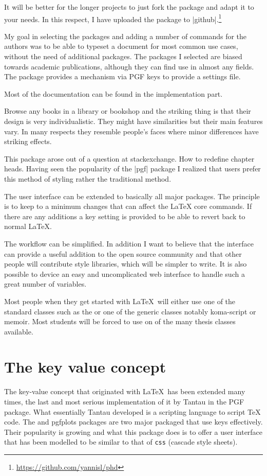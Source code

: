 It will be better for the longer projects to just fork the
 package and adapt it to your needs. In this respect, I have
 uploaded the package to |github|.\footnote{\url{https://github.com/yannisl/phd}}

 My goal in selecting the packages and adding a number of 
 commands for the authors was to be able to typeset a 
 document for most common use cases, without the need of
 additional packages. The packages I selected are biased
 towards academic publications, although they can find use
 in almost any fields. The package provides a mechanism via
 PGF keys to provide a settings file. 
 
 Most of the documentation can be found in the implementation part.

Browse any books in a library or bookshop and the striking thing is that their design is very individualistic. They might have similarities but their main features vary. In many respects they resemble people's faces where minor differences have striking effects.

This package arose out of a question at stackexchange. How to redefine chapter heads. Having seen the popularity of the |pgf| package \cite{pkg-pgf} I realized that \latex users prefer this method of styling rather the traditional \latex method.

The user interface can be extended to basically all major packages. The principle is to keep to a minimum changes that can affect the LaTeX core commands. If there are any additions a key setting is provided to be able to revert back to normal LaTeX.

The workflow can be simplified. In addition I want to believe that the interface can provide a useful addition to the open source community and that other people will contribute style libraries, which will be simpler to write. It is also possible
to device an easy and uncomplicated web interface to handle
such a great number of variables.


Most people when they get started with \LaTeX\ will either use one of the standard classes such as the  or one of the generic classes notably koma-script or memoir. Most students will be forced to use on of the many thesis classes available.

\section{The key value concept}

The key-value concept that originated with \LaTeX\ has been extended many times, the last and most serious implementation of it by Tantau in the PGF package. What essentially Tantau developed is a scripting language to script TeX code. The \tikzname and pgfplots packages are two major packaged that use keys effectively. Their popularity is growing and what this package does is to offer a user interface that has been modelled to be similar to that of \texttt{css} (cascade style sheets). 
\smallskip

